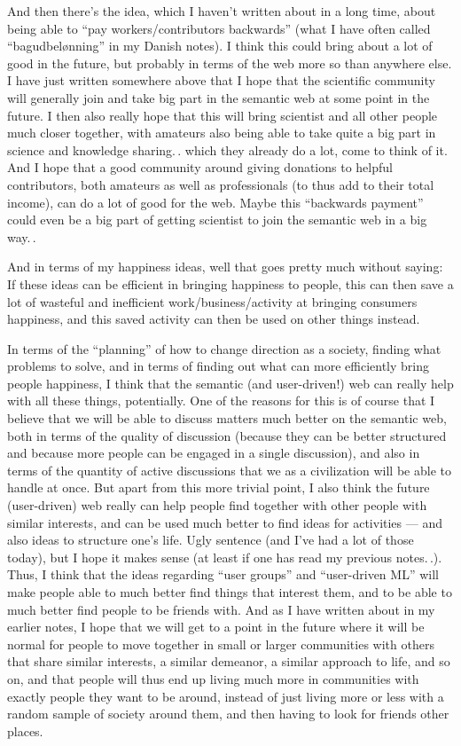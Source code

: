 \documentclass{report}
\begin{document}
And then there's the idea, which I haven't written about in a long time, about being able to ``pay workers/contributors backwards'' (what I have often called ``bagudbelønning'' in my Danish notes). I think this could bring about a lot of good in the future, but probably in terms of the web more so than anywhere else. I have just written somewhere above that I hope that the scientific community will generally join and take big part in the semantic web at some point in the future. I then also really hope that this will bring scientist and all other people much closer together, with amateurs also being able to take quite a big part in science and knowledge sharing.\,. which they already do a lot, come to think of it. And I hope that a good community around giving donations to helpful contributors, both amateurs as well as professionals (to thus add to their total income), can do a lot of good for the web. Maybe this ``backwards payment'' could even be a big part of getting scientist to join the semantic web in a big way.\,.

And in terms of my happiness ideas, well that goes pretty much without saying: If these ideas can be efficient in bringing happiness to people, this can then save a lot of wasteful and inefficient work/business/activity at bringing consumers happiness, and this saved activity can then be used on other things instead. 

In terms of the ``planning'' of how to change direction as a society, finding what problems to solve, and in terms of finding out what can more efficiently bring people happiness, I think that the semantic (and user-driven!) web can really help with all these things, potentially. One of the reasons for this is of course that I believe that we will be able to discuss matters much better on the semantic web, both in terms of the quality of discussion (because they can be better structured and because more people can be engaged in a single discussion), and also in terms of the quantity of active discussions that we as a civilization will be able to handle at once. But apart from this more trivial point, I also think the future (user-driven) web really can help people find together with other people with similar interests, and can be used much better to find ideas for activities --- and also ideas to structure one's life. Ugly sentence (and I've had a lot of those today), but I hope it makes sense (at least if one has read my previous notes.\,.). Thus, I think that the ideas regarding ``user groups'' and ``user-driven ML'' will make people able to much better find things that interest them, and to be able to much better find people to be friends with. And as I have written about in my earlier notes, I hope that we will get to a point in the future where it will be normal for people to move together in small or larger communities with others that share similar interests, a similar demeanor, a similar approach to life, and so on, and that people will thus end up living much more in communities with exactly people they want to be around, instead of just living more or less with a random sample of society around them, and then having to look for friends other places. 
\end{document}
